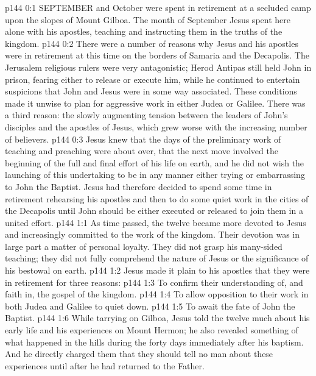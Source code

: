 \vs p144 0:1 SEPTEMBER and October were spent in retirement at a secluded camp upon the slopes of Mount Gilboa. The month of September Jesus spent here alone with his apostles, teaching and instructing them in the truths of the kingdom.
\vs p144 0:2 There were a number of reasons why Jesus and his apostles were in retirement at this time on the borders of Samaria and the Decapolis. The Jerusalem religious rulers were very antagonistic; Herod Antipas still held John in prison, fearing either to release or execute him, while he continued to entertain suspicions that John and Jesus were in some way associated. These conditions made it unwise to plan for aggressive work in either Judea or Galilee. There was a third reason: the slowly augmenting tension between the leaders of John’s disciples and the apostles of Jesus, which grew worse with the increasing number of believers.
\vs p144 0:3 Jesus knew that the days of the preliminary work of teaching and preaching were about over, that the next move involved the beginning of the full and final effort of his life on earth, and he did not wish the launching of this undertaking to be in any manner either trying or embarrassing to John the Baptist. Jesus had therefore decided to spend some time in retirement rehearsing his apostles and then to do some quiet work in the cities of the Decapolis until John should be either executed or released to join them in a united effort.
\vs p144 1:1 As time passed, the twelve became more devoted to Jesus and increasingly committed to the work of the kingdom. Their devotion was in large part a matter of personal loyalty. They did not grasp his many\hyp{}sided teaching; they did not fully comprehend the nature of Jesus or the significance of his bestowal on earth.
\vs p144 1:2 Jesus made it plain to his apostles that they were in retirement for three reasons:
\vs p144 1:3 \bibnobreakspace To confirm their understanding of, and faith in, the gospel of the kingdom.
\vs p144 1:4 \bibnobreakspace To allow opposition to their work in both Judea and Galilee to quiet down.
\vs p144 1:5 \bibnobreakspace To await the fate of John the Baptist.
\vs p144 1:6 \pc While tarrying on Gilboa, Jesus told the twelve much about his early life and his experiences on Mount Hermon; he also revealed something of what happened in the hills during the forty days immediately after his baptism. And he directly charged them that they should tell no man about these experiences until after he had returned to the Father.
